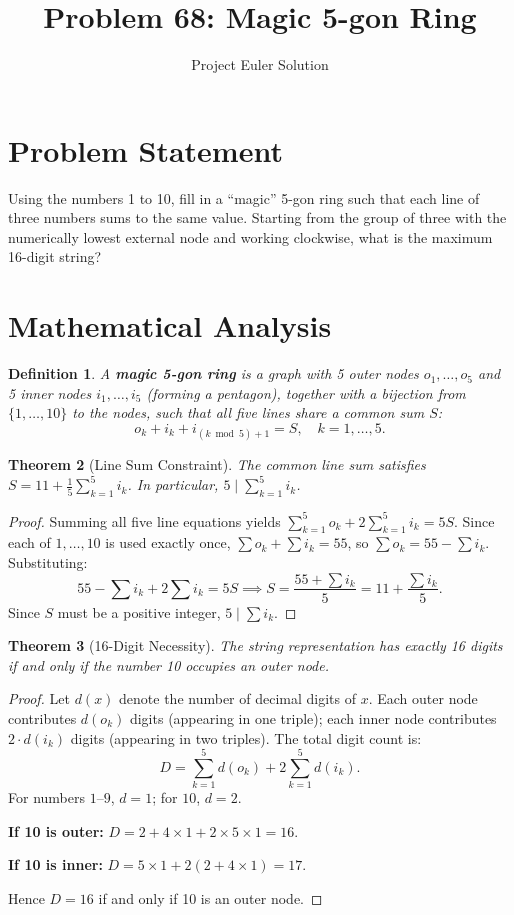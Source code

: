 \documentclass[12pt,a4paper]{article}
\title{Problem 68: Magic 5-gon Ring}
\author{Project Euler Solution}
\date{}
\newtheorem{theorem}{Theorem}
\newtheorem{definition}[theorem]{Definition}
\begin{document}
\maketitle

\section{Problem Statement}

Using the numbers 1 to 10, fill in a ``magic'' 5-gon ring such that each line of three numbers sums to the same value. Starting from the group of three with the numerically lowest external node and working clockwise, what is the maximum 16-digit string?

\section{Mathematical Analysis}

\begin{definition}
A \textbf{magic 5-gon ring} is a graph with 5 outer nodes $o_1, \ldots, o_5$ and 5 inner nodes $i_1, \ldots, i_5$ (forming a pentagon), together with a bijection from $\{1, \ldots, 10\}$ to the nodes, such that all five lines share a common sum $S$:
\[
o_k + i_k + i_{(k \bmod 5) + 1} = S, \quad k = 1, \ldots, 5.
\]
\end{definition}

\begin{theorem}[Line Sum Constraint]
The common line sum satisfies $S = 11 + \frac{1}{5}\sum_{k=1}^{5} i_k$. In particular, $5 \mid \sum_{k=1}^{5} i_k$.
\end{theorem}

\begin{proof}
Summing all five line equations yields $\sum_{k=1}^{5} o_k + 2\sum_{k=1}^{5} i_k = 5S$. Since each of $1, \ldots, 10$ is used exactly once, $\sum o_k + \sum i_k = 55$, so $\sum o_k = 55 - \sum i_k$. Substituting:
\[
55 - \sum i_k + 2\sum i_k = 5S \implies S = \frac{55 + \sum i_k}{5} = 11 + \frac{\sum i_k}{5}.
\]
Since $S$ must be a positive integer, $5 \mid \sum i_k$.
\end{proof}

\begin{theorem}[16-Digit Necessity]
The string representation has exactly 16 digits if and only if the number 10 occupies an outer node.
\end{theorem}

\begin{proof}
Let $d(x)$ denote the number of decimal digits of $x$. Each outer node contributes $d(o_k)$ digits (appearing in one triple); each inner node contributes $2 \cdot d(i_k)$ digits (appearing in two triples). The total digit count is:
\[
D = \sum_{k=1}^{5} d(o_k) + 2\sum_{k=1}^{5} d(i_k).
\]
For numbers $1$--$9$, $d = 1$; for $10$, $d = 2$.

\textbf{If 10 is outer:} $D = 2 + 4 \times 1 + 2 \times 5 \times 1 = 16$.

\textbf{If 10 is inner:} $D = 5 \times 1 + 2(2 + 4 \times 1) = 17$.

Hence $D = 16$ if and only if 10 is an outer node.
\end{proof}
\end{document}
